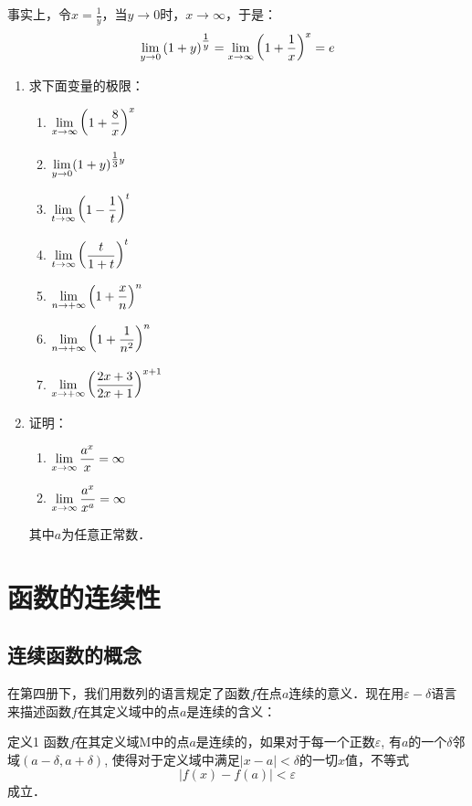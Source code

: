 事实上，令$x=\frac{1}{y}$，当$y\to 0$时，$x\to\infty$，于是：
\[\displaystyle\lim_{y\to 0}\left(1+y\right)^{\tfrac{1}{y}}=\displaystyle\lim_{x\to \infty}\left(1+\dfrac{1}{x}\right)^{x}=e\]

\begin{ex}
\begin{enumerate}
    \item 求下面变量的极限：
\begin{multicols}{2}
\begin{enumerate}
    \item $\displaystyle\lim_{x\to\infty}\left(1+\dfrac{8}{x}\right)^x$
    \item $\displaystyle\lim_{y\to 0}(1+y)^{\tfrac{1}{3}y}$
    \item $\displaystyle\lim_{t\to\infty}\left(1-\dfrac{1}{t}\right)^t$
    \item $\displaystyle\lim_{t\to\infty}\left(\dfrac{t}{1+t}\right)^t$
    \item $\displaystyle\lim_{n\to+\infty}\left(1+\dfrac{x}{n}\right)^n$
    \item $\displaystyle\lim_{n\to +\infty}\left(1+\dfrac{1}{n^2}\right)^n$
    \item $\displaystyle\lim_{x\to+\infty}\left(\dfrac{2x+3}{2x+1}\right)^{x+1}$
\end{enumerate}
\end{multicols}

\item 证明：
\begin{multicols}{2}
\begin{enumerate}
    \item $\displaystyle\lim_{x\to\infty}\dfrac{a^x}{x}=\infty$
    \item $\displaystyle\lim_{x\to\infty}\dfrac{a^x}{x^a}=\infty$
\end{enumerate}
\end{multicols}
其中$a$为任意正常数．
\end{enumerate}
\end{ex}

\section{函数的连续性}
\subsection{连续函数的概念}

在第四册下，我们用数列的语言规定了函数$f$在点$a$连续的意义．现在用$\varepsilon-\delta$语言来描述函数$f$在其定义域中的点$a$是连续的含义：

\begin{blk}
   {定义1} 函数$f$在其定义域M中的点$a$是连续的，如果对于每一个正数$\varepsilon$, 有$a$的一个$\delta$邻域$(a-\delta,a+\delta)$, 使得对于定义域中满足$|x-a|<\delta$的一切$x$值，不等式
\[|f (x) -f(a)|<\varepsilon\]
成立． 
\end{blk}

